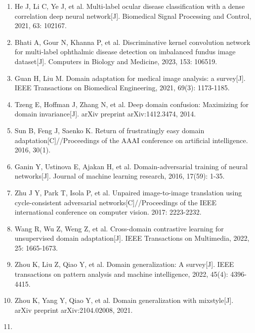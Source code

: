 \begin{enumerate}
\item
  \protect{}\label{_Ref213950338}{}He J, Li C, Ye J, et al. Multi-label ocular disease classification with a dense correlation deep neural network{[}J{]}. Biomedical Signal Processing and Control, 2021, 63: 102167.
\item
  \protect{}\label{_Ref213950343}{}Bhati A, Gour N, Khanna P, et al. Discriminative kernel convolution network for multi-label ophthalmic disease detection on imbalanced fundus image dataset{[}J{]}. Computers in Biology and Medicine, 2023, 153: 106519.
\item
  \protect{}\label{_Ref213949439}{}Guan H, Liu M. Domain adaptation for medical image analysis: a survey{[}J{]}. IEEE Transactions on Biomedical Engineering, 2021, 69(3): 1173-1185.
\item
  \protect{}\label{_Ref213949448}{}Tzeng E, Hoffman J, Zhang N, et al. Deep domain confusion: Maximizing for domain invariance{[}J{]}. arXiv preprint arXiv:1412.3474, 2014.
\item
  \protect{}\label{_Ref213949453}{}Sun B, Feng J, Saenko K. Return of frustratingly easy domain adaptation{[}C{]}//\allowbreak Proceedings of the AAAI conference on artificial intelligence. 2016, 30(1).
\item
  \protect{}\label{_Ref213949479}{}Ganin Y, Ustinova E, Ajakan H, et al. Domain-adversarial training of neural networks{[}J{]}. Journal of machine learning research, 2016, 17(59): 1-35.
\item
  \protect{}\label{_Ref213949490}{}Zhu J Y, Park T, Isola P, et al. Unpaired image-to-image translation using cycle-consistent adversarial networks{[}C{]}//Proceedings of the IEEE international conference on computer vision. 2017: 2223-2232.
\item
  \protect{}\label{_Ref213949530}{}Wang R, Wu Z, Weng Z, et al. Cross-domain contrastive learning for unsupervised domain adaptation{[}J{]}. IEEE Transactions on Multimedia, 2022, 25: 1665-1673.
\item
  \protect{}\label{_Ref213949554}{}Zhou K, Liu Z, Qiao Y, et al. Domain generalization: A survey{[}J{]}. IEEE transactions on pattern analysis and machine intelligence, 2022, 45(4): 4396-4415.
\item
  \protect{}\label{_Ref213949562}{}Zhou K, Yang Y, Qiao Y, et al. Domain generalization with mixstyle{[}J{]}. arXiv preprint arXiv:2104.02008, 2021.
\item

\end{enumerate}
